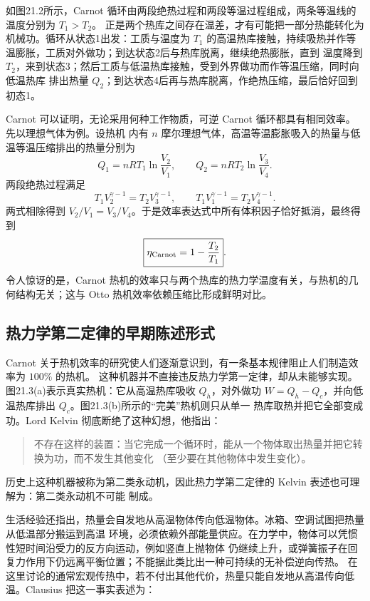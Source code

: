 如图21.2所示，Carnot 循环由两段绝热过程和两段等温过程组成，两条等温线的温度分别为 $T_1>T_2$。
正是两个热库之间存在温差，才有可能把一部分热能转化为机械功。循环从状态1出发：工质与温度为 $T_1$
的高温热库接触，持续吸热并作等温膨胀，工质对外做功；到达状态2后与热库脱离，继续绝热膨胀，直到
温度降到 $T_2$，来到状态3；然后工质与低温热库接触，受到外界做功而作等温压缩，同时向低温热库
排出热量 $Q_2$；到达状态4后再与热库脱离，作绝热压缩，最后恰好回到初态1。

Carnot 可以证明，无论采用何种工作物质，可逆 Carnot 循环都具有相同效率。先以理想气体为例。设热机
内有 $n$ 摩尔理想气体，高温等温膨胀吸入的热量与低温等温压缩排出的热量分别为
\[
  Q_1=nRT_1\ln\frac{V_2}{V_1},
  \qquad
  Q_2=nRT_2\ln\frac{V_3}{V_4}.
\]
两段绝热过程满足
\[
  T_1V_2^{\gamma-1}=T_2V_3^{\gamma-1},
  \qquad
  T_1V_1^{\gamma-1}=T_2V_4^{\gamma-1}.
\]
两式相除得到 $V_2/V_1=V_3/V_4$。于是效率表达式中所有体积因子恰好抵消，最终得到
\begin{equation}
  \boxed{\eta_{\rm Carnot}=1-\frac{T_2}{T_1}}.
\end{equation}
令人惊讶的是，Carnot 热机的效率只与两个热库的热力学温度有关，与热机的几何结构无关；这与 Otto
热机效率依赖压缩比形成鲜明对比。

\subsection*{热力学第二定律的早期陈述形式}

Carnot 关于热机效率的研究使人们逐渐意识到，有一条基本规律阻止人们制造效率为 $100\%$ 的热机。
这种机器并不直接违反热力学第一定律，却从未能够实现。图21.3(a)表示真实热机：它从高温热库吸收
$Q_h$，对外做功 $W=Q_h-Q_c$，并向低温热库排出 $Q_c$。图21.3(b)所示的“完美”热机则只从单一
热库取热并把它全部变成功。Lord Kelvin 彻底断绝了这种幻想，他指出：

\begin{quote}\small
不存在这样的装置：当它完成一个循环时，能从一个物体取出热量并把它转换为功，而不发生其他变化
（至少要在其他物体中发生变化）。
\end{quote}

历史上这种机器被称为第二类永动机，因此热力学第二定律的 Kelvin 表述也可理解为：第二类永动机不可能
制成。

\heatDevicesFigure
{}

生活经验还指出，热量会自发地从高温物体传向低温物体。冰箱、空调试图把热量从低温部分搬运到高温
环境，必须依赖外部能量供应。在力学中，物体可以凭惯性短时间沿受力的反方向运动，例如竖直上抛物体
仍继续上升，或弹簧振子在回复力作用下仍远离平衡位置；不能据此类比出一种可持续的无补偿逆向传热。
在这里讨论的通常宏观传热中，若不付出其他代价，热量只能自发地从高温传向低温。Clausius 把这一事实表述为：

